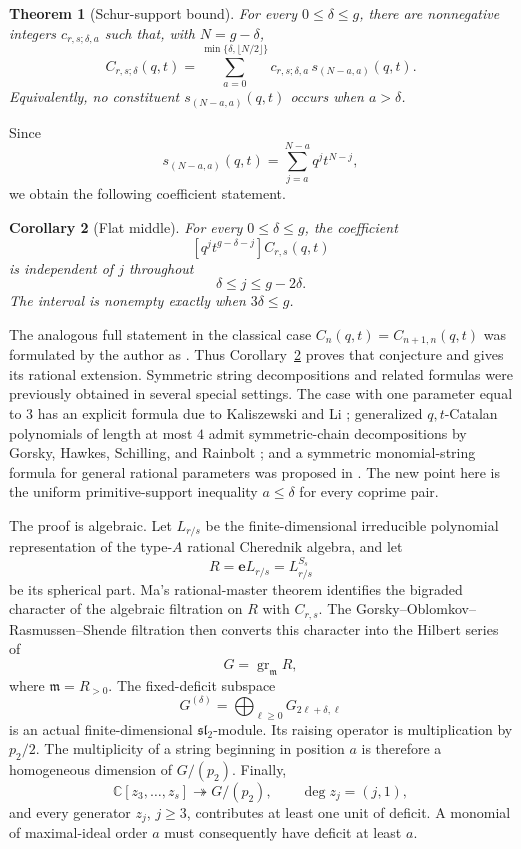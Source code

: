 \documentclass[11pt]{article}
\newtheorem{theorem}{Theorem}[section]
\newtheorem{corollary}[theorem]{Corollary}
\newcommand{\C}{\mathbb{C}}
\newcommand{\gr}{\operatorname{gr}}
\newcommand{\e}{\mathbf e}
\begin{document}
\begin{theorem}[Schur-support bound]\label{thm:main}
For every $0\leq\delta\leq g$, there are nonnegative integers
$c_{r,s;\delta,a}$ such that, with $N=g-\delta$,
\begin{equation}\label{eq:main-Schur}
 C_{r,s;\delta}(q,t)
 =\sum_{a=0}^{\min\{\delta,\lfloor N/2\rfloor\}}
 c_{r,s;\delta,a}\,s_{(N-a,a)}(q,t).
\end{equation}
Equivalently, no constituent $s_{(N-a,a)}(q,t)$ occurs when
$a>\delta$.
\end{theorem}

Since
\begin{equation}\label{eq:two-variable-Schur}
 s_{(N-a,a)}(q,t)
 =\sum_{j=a}^{N-a}q^jt^{N-j},
\end{equation}
we obtain the following coefficient statement.

\begin{corollary}[Flat middle]\label{cor:flat-middle}
For every $0\leq\delta\leq g$, the coefficient
\[
 [q^jt^{g-\delta-j}]C_{r,s}(q,t)
\]
is independent of $j$ throughout
\begin{equation}\label{eq:flat-interval}
 \delta\leq j\leq g-2\delta.
\end{equation}
The interval is nonempty exactly when $3\delta\leq g$.
\end{corollary}

The analogous full statement in the classical case
$C_n(q,t)=C_{n+1,n}(q,t)$ was formulated by the author as
\cite[Conjecture~5.38]{HawkesDyck}.  Thus
Corollary~\ref{cor:flat-middle} proves that conjecture and gives its
rational extension.  Symmetric string decompositions and related
formulas were previously obtained in several special settings.  The
case with one parameter equal to $3$ has an explicit formula due to
Kaliszewski and Li \cite{KaliszewskiLi}; generalized $q,t$-Catalan
polynomials of length at most $4$ admit symmetric-chain decompositions
by Gorsky, Hawkes, Schilling, and Rainbolt \cite{GHSR}; and a
symmetric monomial-string formula for general rational parameters was
proposed in \cite{HawkesRational}.  The new point here is the uniform
primitive-support inequality $a\leq\delta$ for every coprime pair.

The proof is algebraic.  Let $L_{r/s}$ be the finite-dimensional
irreducible polynomial representation of the type-$A$ rational
Cherednik algebra, and let
\[
 R=\e L_{r/s}=L_{r/s}^{S_s}
\]
be its spherical part.  Ma's rational-master theorem identifies the
bigraded character of the algebraic filtration on $R$ with
$C_{r,s}$.  The Gorsky--Oblomkov--Rasmussen--Shende filtration then
converts this character into the Hilbert series of
\[
 G=\gr_{\mathfrak m}R,
\]
where $\mathfrak m=R_{>0}$.  The fixed-deficit subspace
\[
 G^{(\delta)}=\bigoplus_{\ell\geq0}G_{2\ell+\delta,\ell}
\]
is an actual finite-dimensional $\mathfrak{sl}_2$-module.  Its
raising operator is multiplication by $p_2/2$.  The multiplicity of a
string beginning in position $a$ is therefore a homogeneous dimension
of $G/(p_2)$.  Finally,
\[
 \C[z_3,\ldots,z_s]\twoheadrightarrow G/(p_2),
 \qquad \deg z_j=(j,1),
\]
and every generator $z_j$, $j\geq3$, contributes at least one unit of
deficit.  A monomial of maximal-ideal order $a$ must consequently
have deficit at least $a$.
\end{document}

